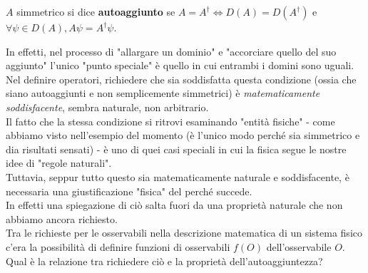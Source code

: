 \begin{dfn}
$A$ simmetrico si dice \textbf{autoaggiunto} se $A=A^\dag\Leftrightarrow D\left(A\right)=D\left(A^\dag\right)$ e $\forall\psi\in D(A), A\psi=A^\dag\psi$.
\end{dfn}
In effetti, nel processo di "allargare un dominio" e "accorciare quello del suo aggiunto" l'unico "punto speciale" è quello in cui entrambi i domini sono uguali. Nel definire operatori, richiedere che sia soddisfatta questa condizione (ossia che siano autoaggiunti e non semplicemente simmetrici) è \textit{matematicamente soddisfacente}, sembra naturale, non arbitrario.\\
Il fatto che la stessa condizione si ritrovi esaminando "entità fisiche" - come abbiamo visto nell'esempio del momento (è l'unico modo perché sia simmetrico e dia risultati sensati) - è uno di quei casi speciali in cui la fisica segue le nostre idee di "regole naturali".\\
Tuttavia, seppur tutto questo sia matematicamente naturale e soddisfacente, è necessaria una giustificazione "fisica" del perché succede.\\
In effetti una spiegazione di ciò salta fuori da una proprietà naturale che non abbiamo ancora richiesto.\\

Tra le richieste per le osservabili nella descrizione matematica di un sistema fisico c'era la possibilità di definire funzioni di osservabili $f(O)$ dell'osservabile $O$. Qual è la relazione tra richiedere ciò e la proprietà dell'autoaggiuntezza?\\

